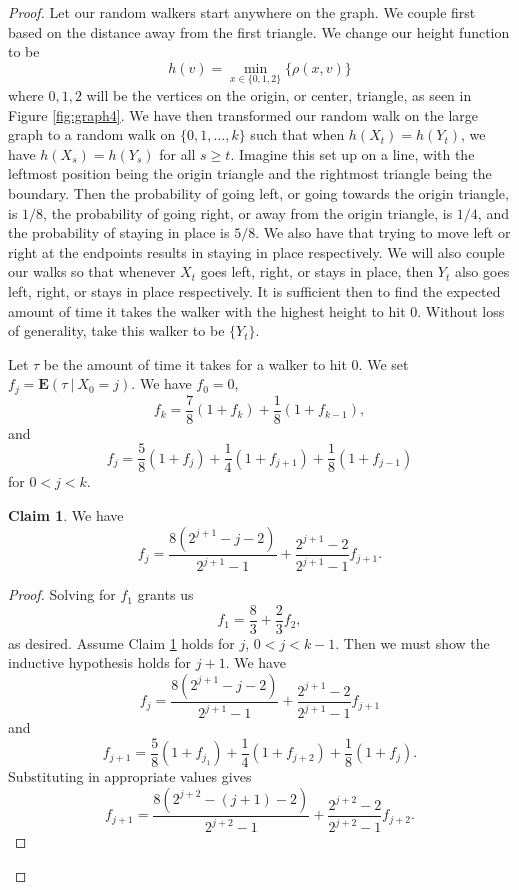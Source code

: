 \documentclass[10pt,a4paper]{amsart}
\theoremstyle{definition}
\numberwithin{definition}{section}
\newtheorem{claim}[definition]{Claim}
\begin{document}
\begin{proof}
Let our random walkers start anywhere on the graph. We couple first based on the distance away from the first triangle. We change our height function to be 
\[h(v) = \min_{x \in \{0,1,2\}} \{\rho(x,v)\} \]
where $0,1,2$ will be the vertices on the origin, or center, triangle, as seen in Figure \ref{fig:graph4}. We have then transformed our random walk on the large graph to a random walk on $\{0, 1, \ldots, k\}$ such that when $h(X_t) = h(Y_t)$, we have $h(X_s) = h(Y_s)$ for all $s \geq t$. Imagine this set up on a line, with the leftmost position being the origin triangle and the rightmost triangle being the boundary. Then the probability of going left, or going towards the origin triangle, is $1/8$, the probability of going right, or away from the origin triangle, is $1/4$, and the probability of staying in place is $5/8$. We also have that trying to move left or right at the endpoints results in staying in place respectively. We will also couple our walks so that whenever $X_t$ goes left, right, or stays in place, then $Y_t$ also goes left, right, or stays in place respectively. It is sufficient then to find the expected amount of time it takes the walker with the highest height to hit $0$. Without loss of generality, take this walker to be $\{Y_t\}$.

Let $\tau$ be the amount of time it takes for a walker to hit $0$. We set $f_j = \mathbf{E}(\tau \ | \ X_0 = j)$. We have $f_0 = 0$, 
\[f_k = \frac{7}{8}(1+f_k) + \frac{1}{8}(1+f_{k-1}), \]
and
\[f_j = \frac{5}{8}(1 + f_j) + \frac{1}{4}(1+f_{j+1}) + \frac{1}{8}(1+f_{j-1}) \]
for $0 < j < k$. 

\begin{claim}\label{claim:free}
We have
\[f_j =  \frac{8(2^{j+1}-j-2)}{2^{j+1}-1} + \frac{2^{j+1}-2}{2^{j+1}-1}f_{j+1}. \]
\end{claim}

\begin{proof}
Solving for $f_1$ grants us 
\[f_1 = \frac{8}{3} + \frac{2}{3}f_2, \]
as desired. Assume Claim \ref{claim:free} holds for $j$, $0 < j < k-1$. Then we must show the inductive hypothesis holds for $j +1$. We have
\[f_j =  \frac{8(2^{j+1}-j-2)}{2^{j+1}-1} + \frac{2^{j+1}-2}{2^{j+1}-1}f_{j+1} \]
and
\[f_{j+1} = \frac{5}{8}(1+f_{j_1}) + \frac{1}{4}(1+f_{j+2}) + \frac{1}{8}(1+f_j). \]
Substituting in appropriate values gives
\[f_{j+1} =  \frac{8(2^{j+2}-(j+1)-2)}{2^{j+2}-1} + \frac{2^{j+2}-2}{2^{j+2}-1}f_{j+2}. \]
\end{proof}


\end{proof}
\end{document}
